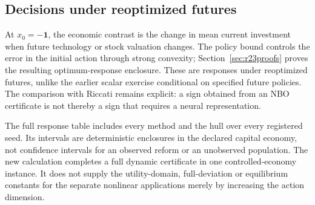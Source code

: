 



\subsection{Decisions under reoptimized futures}
At $x_0=-\mathbf1$, the economic contrast is the change in mean current
investment when future technology or stock valuation changes. The policy
bound controls the error in the initial action through strong convexity;
Section~\ref{sec:r23proofs} proves the resulting optimum-response enclosure.
These are responses under reoptimized futures, unlike the earlier scalar
exercise conditional on specified future policies. The comparison with
Riccati remains explicit: a sign obtained from an NBO certificate is not
thereby a sign that requires a neural representation.



The full response table includes every method and the hull over every
registered seed. Its intervals are deterministic enclosures in the declared
capital economy, not confidence intervals for an observed reform or an
unobserved population. The new calculation completes a full dynamic
certificate in one controlled-economy instance. It does not supply the
utility-domain, full-deviation or equilibrium constants for the separate
nonlinear applications merely by increasing the action dimension.
